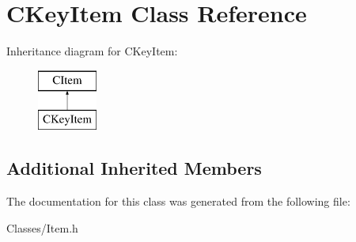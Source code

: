 \hypertarget{class_c_key_item}{}\section{C\+Key\+Item Class Reference}
\label{class_c_key_item}
Inheritance diagram for C\+Key\+Item\+:\begin{figure}[H]
\begin{center}
\leavevmode
\includegraphics[height=2.000000cm]{class_c_key_item}
\end{center}
\end{figure}
\subsection*{Additional Inherited Members}


The documentation for this class was generated from the following file\+:\begin{DoxyCompactItemize}
\item 
Classes/Item.\+h\end{DoxyCompactItemize}
